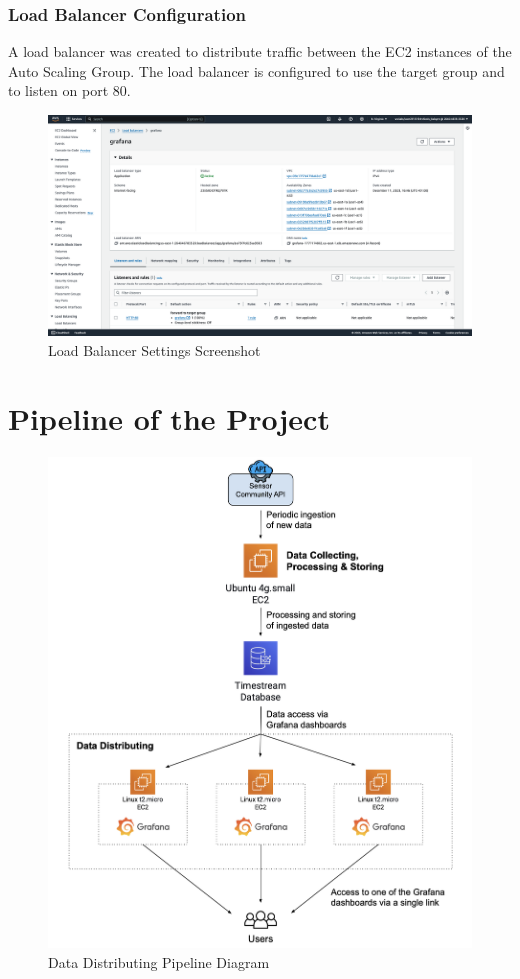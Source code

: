\documentclass[12pt,oneside]{book} %
\begin{document}
\newpage 
\subsubsection{Load Balancer Configuration}
A load balancer was created to distribute traffic between the EC2 instances of
the Auto Scaling Group. The load balancer is configured to use the target group
and to listen on port 80.

\begin{figure}[H]
    \centering
    \includegraphics[width=1\linewidth]{images/load-balancer.png}
    \caption{Load Balancer Settings Screenshot}
\end{figure}

\newpage
\section{Pipeline of the Project}

\begin{figure}[H]
    \centering
    \includegraphics[width=1\linewidth]{images/pipeline.png}
    \caption{Data Distributing Pipeline Diagram}
\end{figure}
\end{document}
